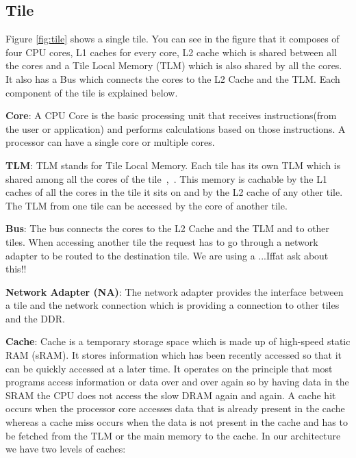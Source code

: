 \documentclass{listhesis}
\begin{document}
\subsection{Tile}
Figure \ref{fig:tile} shows a single tile. You can see in the figure that it composes of four CPU cores, L1 caches for every core, L2 cache which is shared between all the cores and a Tile Local Memory (TLM) which is also shared by all the cores. It also has a Bus which connects the cores to the L2 Cache and the TLM. Each component of the tile is explained below.\\
\par
\textbf{Core}: A CPU Core is the basic processing unit that receives instructions(from the user or application) and performs calculations based on those instructions. A processor can have a single core or multiple cores. \\ 
\par
\textbf{TLM}: TLM stands for Tile Local Memory. Each tile has its own TLM which is shared among all the cores of the tile~\cite{ankitThesis},~\cite{iNetworkAdapter}. This memory is cachable by the L1 caches of all the cores in the tile it sits on and by the L2 cache of any other tile. The TLM from one tile can be accessed by the core of another tile.\\
\par
\textbf{Bus}: The bus connects the cores to the L2 Cache and the TLM and to other tiles. When accessing another tile the request has to go through a network adapter to be routed to the destination tile. We are using a ...Iffat ask about this!!\\
\par
\textbf{Network Adapter (NA)}: The network adapter provides the interface between a tile and the network connection which is providing a connection to other tiles and the DDR.\\
\par
\textbf{Cache}: Cache is a temporary storage space which is made up of high-speed static RAM (sRAM). It stores information which has been recently accessed so that it can be quickly accessed at a later time. It operates on the principle that most programs access information or data over and over again so by having data in the SRAM the CPU does not access the slow DRAM again and again. A cache hit occurs when the processor core accesses data that is already present in the cache whereas a cache miss occurs when the data is not present in the cache and has to be fetched from the TLM or the main memory to the cache. In our architecture we have two levels of caches:
\end{document}
